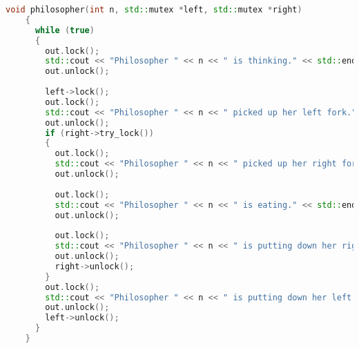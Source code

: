 \begin{lstlisting}[language=C++, caption=Arbitrator/Waiter code modification]
void philosopher(int n, std::mutex *left, std::mutex *right)
    {
      while (true)
      {
        out.lock();
        std::cout << "Philosopher " << n << " is thinking." << std::endl;
        out.unlock();
    
        left->lock();
        out.lock();
        std::cout << "Philosopher " << n << " picked up her left fork." << std::endl;
        out.unlock();
        if (right->try_lock())
        {
          out.lock();
          std::cout << "Philosopher " << n << " picked up her right fork." << std::endl;
          out.unlock();
    
          out.lock();
          std::cout << "Philosopher " << n << " is eating." << std::endl;
          out.unlock();
    
          out.lock();
          std::cout << "Philosopher " << n << " is putting down her right fork." << std::endl;
          out.unlock();
          right->unlock();
        }
        out.lock();
        std::cout << "Philosopher " << n << " is putting down her left fork." << std::endl;
        out.unlock();
        left->unlock();
      }
    }
\end{lstlisting}